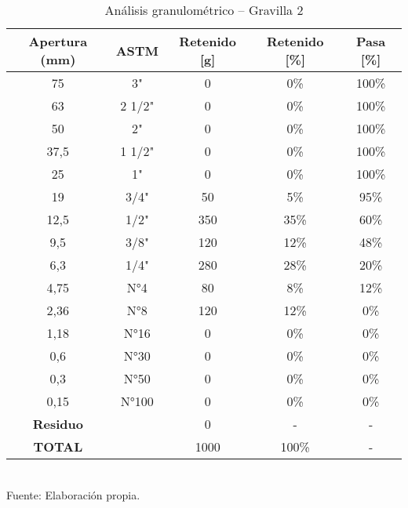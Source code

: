 \begin{table}[H]
\centering
\caption{Análisis granulométrico – Gravilla 2}
\label{tab:gravilla2}
\small
\begin{tabular}{|c|c|c|c|c|}
\hline
\textbf{Apertura (mm)} & \textbf{ASTM} & \textbf{Retenido [g]} & \textbf{Retenido [\%]} & \textbf{Pasa [\%]} \\ \hline
75   & 3"      & 0   & 0\%  & 100\% \\ \hline
63   & 2 1/2"  & 0   & 0\%  & 100\% \\ \hline
50   & 2"      & 0   & 0\%  & 100\% \\ \hline
37,5 & 1 1/2"  & 0   & 0\%  & 100\% \\ \hline
25   & 1"      & 0   & 0\%  & 100\% \\ \hline
19   & 3/4"    & 50  & 5\%  & 95\%  \\ \hline
12,5 & 1/2"    & 350 & 35\% & 60\%  \\ \hline
9,5  & 3/8"    & 120 & 12\% & 48\%  \\ \hline
6,3  & 1/4"    & 280 & 28\% & 20\%  \\ \hline
4,75 & N°4     & 80  & 8\%  & 12\%  \\ \hline
2,36 & N°8     & 120 & 12\% & 0\%   \\ \hline
1,18 & N°16    & 0   & 0\%  & 0\%   \\ \hline
0,6  & N°30    & 0   & 0\%  & 0\%   \\ \hline
0,3  & N°50    & 0   & 0\%  & 0\%   \\ \hline
0,15 & N°100   & 0   & 0\%  & 0\%   \\ \hline
\textbf{Residuo} &     & 0   & -    & -     \\ \hline
\textbf{TOTAL}  &     & 1000& 100\%& -     \\ \hline
\end{tabular}
\\ Fuente: Elaboración propia.
\end{table}

